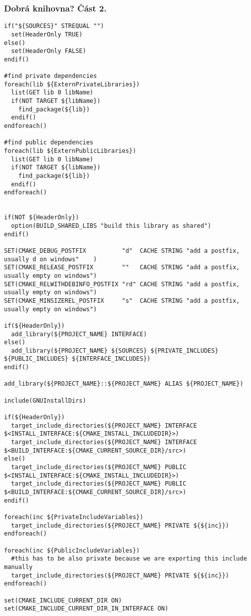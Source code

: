 \begin{frame}[fragile]
\frametitle{Dobrá knihovna? Část 2.}
{\fontsize{2}{2}
\begin{verbatim}
if("${SOURCES}" STREQUAL "")
  set(HeaderOnly TRUE)
else()
  set(HeaderOnly FALSE)
endif()

#find private dependencies
foreach(lib ${ExternPrivateLibraries})
  list(GET lib 0 libName)
  if(NOT TARGET ${libName}) 
    find_package(${lib})
  endif()
endforeach()

#find public dependencies
foreach(lib ${ExternPublicLibraries})
  list(GET lib 0 libName)
  if(NOT TARGET ${libName}) 
    find_package(${lib})
  endif()
endforeach()


if(NOT ${HeaderOnly})
  option(BUILD_SHARED_LIBS "build this library as shared")
endif()

SET(CMAKE_DEBUG_POSTFIX          "d"  CACHE STRING "add a postfix, usually d on windows"    )
SET(CMAKE_RELEASE_POSTFIX        ""   CACHE STRING "add a postfix, usually empty on windows")
SET(CMAKE_RELWITHDEBINFO_POSTFIX "rd" CACHE STRING "add a postfix, usually empty on windows")
SET(CMAKE_MINSIZEREL_POSTFIX     "s"  CACHE STRING "add a postfix, usually empty on windows")

if(${HeaderOnly})
  add_library(${PROJECT_NAME} INTERFACE)
else()
  add_library(${PROJECT_NAME} ${SOURCES} ${PRIVATE_INCLUDES} ${PUBLIC_INCLUDES} ${INTERFACE_INCLUDES})
endif()

add_library(${PROJECT_NAME}::${PROJECT_NAME} ALIAS ${PROJECT_NAME})

include(GNUInstallDirs)

if(${HeaderOnly})
  target_include_directories(${PROJECT_NAME} INTERFACE $<INSTALL_INTERFACE:${CMAKE_INSTALL_INCLUDEDIR}>)
  target_include_directories(${PROJECT_NAME} INTERFACE $<BUILD_INTERFACE:${CMAKE_CURRENT_SOURCE_DIR}/src>)
else()
  target_include_directories(${PROJECT_NAME} PUBLIC $<INSTALL_INTERFACE:${CMAKE_INSTALL_INCLUDEDIR}>)
  target_include_directories(${PROJECT_NAME} PUBLIC $<BUILD_INTERFACE:${CMAKE_CURRENT_SOURCE_DIR}/src>)
endif()

foreach(inc ${PrivateIncludeVariables})
  target_include_directories(${PROJECT_NAME} PRIVATE ${${inc}})
endforeach()

foreach(inc ${PublicIncludeVariables})
  #this has to be also private because we are exporting this include manually
  target_include_directories(${PROJECT_NAME} PRIVATE ${${inc}})
endforeach()

set(CMAKE_INCLUDE_CURRENT_DIR ON)
set(CMAKE_INCLUDE_CURRENT_DIR_IN_INTERFACE ON)


\end{verbatim}}
\end{frame}
